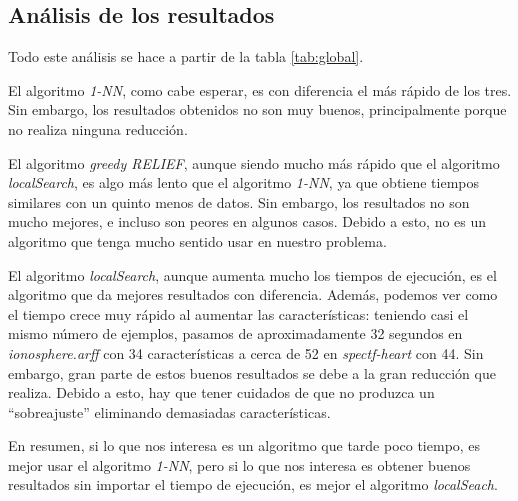 \documentclass[11pt,a4paper]{article}
\begin{document}
\subsection{Análisis de los resultados}

Todo este análisis se hace a partir de la tabla \ref{tab:global}.

El algoritmo \emph{1-NN}, como cabe esperar, es con diferencia el más rápido de los tres. Sin embargo, los resultados obtenidos no son muy buenos, principalmente porque no realiza ninguna reducción.

El algoritmo \emph{greedy RELIEF}, aunque siendo mucho más rápido que el algoritmo \emph{localSearch}, es algo más lento que el algoritmo \emph{1-NN}, ya que obtiene tiempos similares con un quinto menos de datos. Sin embargo, los resultados no son mucho mejores, e incluso son peores en algunos casos. Debido a esto, no es un algoritmo que tenga mucho sentido usar en nuestro problema.

El algoritmo \emph{localSearch}, aunque aumenta mucho los tiempos de ejecución, es el algoritmo que da mejores resultados con diferencia. Además, podemos ver como el tiempo crece muy rápido al aumentar las características: teniendo casi el mismo número de ejemplos, pasamos de aproximadamente 32 segundos en \emph{ionosphere.arff} con 34 características a cerca de 52 en \emph{spectf-heart} con 44. Sin embargo, gran parte de estos buenos resultados se debe a la gran reducción que realiza. Debido a esto, hay que tener cuidados de que no produzca un ``sobreajuste'' eliminando demasiadas características.

En resumen, si lo que nos interesa es un algoritmo que tarde poco tiempo, es mejor usar el algoritmo \emph{1-NN}, pero si lo que nos interesa es obtener buenos resultados sin importar el tiempo de ejecución, es mejor el algoritmo \emph{localSeach}.
\end{document}
